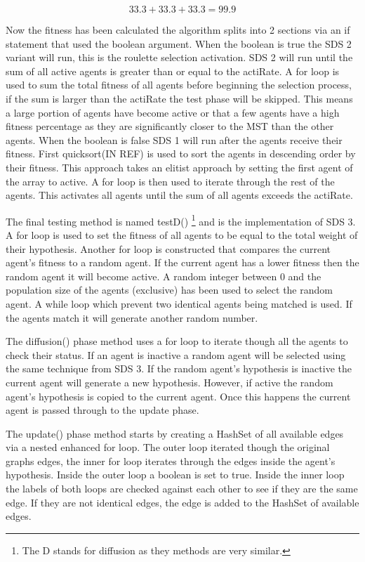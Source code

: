 \documentclass{AISB2008}
\begin{document}
\begin{equation}
33.3 + 33.3 + 33.3 = 99.9
\end{equation}

Now the fitness has been calculated the algorithm splits into 2 sections via an if statement that used the boolean argument. When the boolean is true the SDS 2 variant will run, this is the roulette selection activation. SDS 2 will run until the sum of all active agents is greater than or equal to the actiRate. A for loop is used to sum the total fitness of all agents before beginning the selection process, if the sum is larger than the actiRate the test phase will be skipped. This means a large portion of agents have become active or that a few agents have a high fitness percentage as they are significantly closer to the MST than the other agents.
When the boolean is false SDS 1 will run after the agents receive their fitness. First quicksort(IN REF) is used to sort the agents in descending order by their fitness. This approach takes an elitist approach by setting the first agent of the array to active. A for loop is then used to iterate through the rest of the agents. This activates all agents until the sum of all agents exceeds the actiRate.

The final testing method is named testD() \footnote{The D stands for diffusion as they methods are very similar.} and is the implementation of SDS 3. A for loop is used to set the fitness of all agents to be equal to the total weight of their hypothesis. Another for loop is constructed that compares the current agent’s fitness to a random agent. If the current agent has a lower fitness then the random agent it will become active. A random integer between 0 and the population size of the agents (exclusive) has been used to select the random agent. A while loop which prevent two identical agents being matched is used. If the agents match it will generate another random number.

The diffusion() phase method uses a for loop to iterate though all the agents to check their status. If an agent is inactive a random agent will be selected using the same technique from SDS 3. If the random agent’s hypothesis is inactive the current agent will generate a new hypothesis. However, if active the random agent’s hypothesis is copied to the current agent. Once this happens the current agent is passed through to the update phase.

The update() phase method starts by creating a HashSet of all available edges via a nested enhanced for loop. The outer loop iterated though the original graphs edges, the inner for loop iterates through the edges inside the agent’s hypothesis. Inside the outer loop a boolean is set to true. Inside the inner loop the labels of both loops are checked against each other to see if they are the same edge. If they are not identical edges, the edge is added to the HashSet of available edges.
\end{document}
